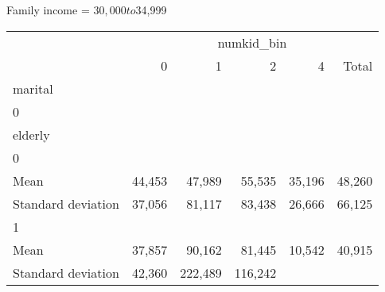 Family income = $30,000 to $34,999
\begin{tabular}{llllll}
\cline{1-6}
\multicolumn{1}{c}{} &
  \multicolumn{5}{|c}{numkid\_bin} \\
\multicolumn{1}{c}{} &
  \multicolumn{1}{|r}{0} &
  \multicolumn{1}{r}{1} &
  \multicolumn{1}{r}{2} &
  \multicolumn{1}{r}{4} &
  \multicolumn{1}{r}{Total} \\
\cline{1-6}
\multicolumn{1}{l}{marital} &
  \multicolumn{1}{|r}{} &
  \multicolumn{1}{r}{} &
  \multicolumn{1}{r}{} &
  \multicolumn{1}{r}{} &
  \multicolumn{1}{r}{} \\
\multicolumn{1}{l}{\hspace{1em}0} &
  \multicolumn{1}{|r}{} &
  \multicolumn{1}{r}{} &
  \multicolumn{1}{r}{} &
  \multicolumn{1}{r}{} &
  \multicolumn{1}{r}{} \\
\multicolumn{1}{l}{\hspace{2em}elderly} &
  \multicolumn{1}{|r}{} &
  \multicolumn{1}{r}{} &
  \multicolumn{1}{r}{} &
  \multicolumn{1}{r}{} &
  \multicolumn{1}{r}{} \\
\multicolumn{1}{l}{\hspace{3em}0} &
  \multicolumn{1}{|r}{} &
  \multicolumn{1}{r}{} &
  \multicolumn{1}{r}{} &
  \multicolumn{1}{r}{} &
  \multicolumn{1}{r}{} \\
\multicolumn{1}{l}{\hspace{4em}Mean} &
  \multicolumn{1}{|r}{44,453} &
  \multicolumn{1}{r}{47,989} &
  \multicolumn{1}{r}{55,535} &
  \multicolumn{1}{r}{35,196} &
  \multicolumn{1}{r}{48,260} \\
\multicolumn{1}{l}{\hspace{4em}Standard deviation} &
  \multicolumn{1}{|r}{37,056} &
  \multicolumn{1}{r}{81,117} &
  \multicolumn{1}{r}{83,438} &
  \multicolumn{1}{r}{26,666} &
  \multicolumn{1}{r}{66,125} \\
\multicolumn{1}{l}{\hspace{3em}1} &
  \multicolumn{1}{|r}{} &
  \multicolumn{1}{r}{} &
  \multicolumn{1}{r}{} &
  \multicolumn{1}{r}{} &
  \multicolumn{1}{r}{} \\
\multicolumn{1}{l}{\hspace{4em}Mean} &
  \multicolumn{1}{|r}{37,857} &
  \multicolumn{1}{r}{90,162} &
  \multicolumn{1}{r}{81,445} &
  \multicolumn{1}{r}{10,542} &
  \multicolumn{1}{r}{40,915} \\
\multicolumn{1}{l}{\hspace{4em}Standard deviation} &
  \multicolumn{1}{|r}{42,360} &
  \multicolumn{1}{r}{222,489} &
  \multicolumn{1}{r}{116,242} &

\end{tabular}
